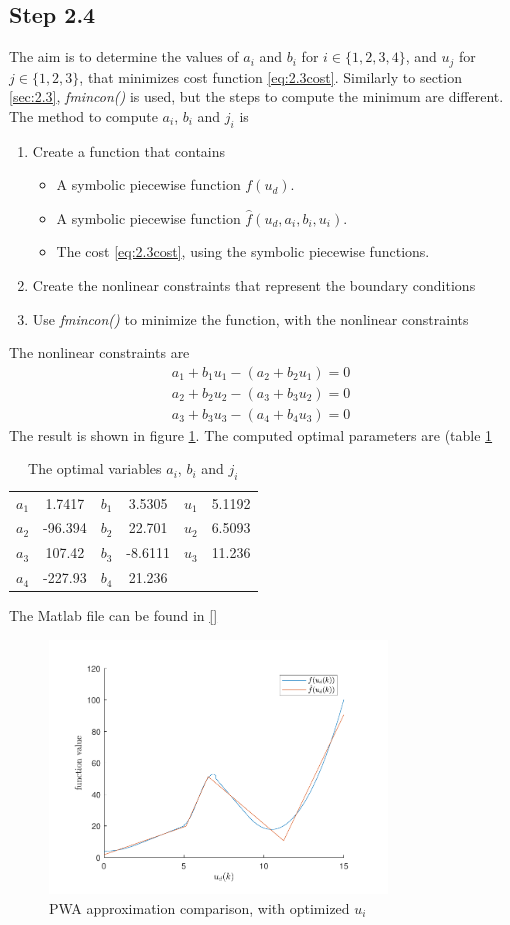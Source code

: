 \subsection*{Step 2.4}
The aim is to determine the values of $a_i$ and $b_i$ for $i \in \{1,2,3,4\}$, and $u_j$  for $j \in \{1,2,3\}$, that minimizes cost function \ref{eq:2.3cost}. Similarly to section \ref{sec:2.3}, \textit{fmincon()} is used, but the steps to compute the minimum are different. The method to compute $a_i$, $b_i$ and $j_i$ is
\begin{enumerate}
    \item Create a function that contains
    \begin{itemize}
        \item A symbolic piecewise function $f(u_d)$.
        \item A symbolic piecewise function $\hat{f}(u_d,a_i,b_i,u_i)$.
        \item The cost \ref{eq:2.3cost}, using the symbolic piecewise functions.
    \end{itemize}
    \item Create the nonlinear constraints that represent the boundary conditions
    \item Use \textit{fmincon()} to minimize the function, with the nonlinear constraints
\end{enumerate}
The nonlinear constraints are 
\begin{align*}
    a_1 + b_1u_1 - (a_2+b_2u_1) = 0\\
    a_2 + b_2u_2 - (a_3+b_3u_2) = 0\\
    a_3 + b_3u_3 - (a_4+b_4u_3) = 0
\end{align*}
The result is shown in figure \ref{fig:part24}. The computed optimal parameters are (table \ref{tab:2.4table}
\begin{table}[h]
    \centering
    \caption{The optimal variables $a_i$, $b_i$ and $j_i$}
    \begin{tabular}{c|c|c|c|c|c}
    \hline
         $a_1$ &  1.7417 & $b_1$ & 3.5305 & $u_1$ & 5.1192\\
         $a_2$ &  -96.394 & $b_2$ & 22.701 & $u_2$ & 6.5093\\
         $a_3$ &  107.42 & $b_3$ & -8.6111 & $u_3$ & 11.236\\
         $a_4$ &  -227.93 & $b_4$ & 21.236 &  &  
    \end{tabular}
    \label{tab:2.4table}
\end{table}
The Matlab file can be found in \ref{}
\begin{figure}
    \centering
    \includegraphics[width=0.8\textwidth]{Latex/images/step24.pdf}
    \caption{PWA approximation comparison, with optimized $u_i$}
    \label{fig:part24}
\end{figure}